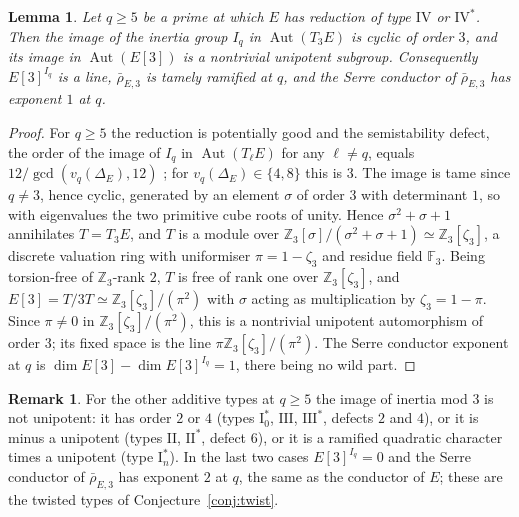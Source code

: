 \documentclass[11pt]{amsart}
\newtheorem{lemma}[theorem]{Lemma}
\theoremstyle{definition}
\newtheorem{remark}[theorem]{Remark}
\newcommand{\Z}{\mathbb{Z}}
\newcommand{\F}{\mathbb{F}}
\begin{document}
\begin{lemma}\label{lem:IV}
Let $q\ge5$ be a prime at which $E$ has reduction of type $\mathrm{IV}$ or $\mathrm{IV}^*$. Then the image of the inertia group $I_q$ in $\operatorname{Aut}(T_3E)$ is cyclic of order $3$, and its image in $\operatorname{Aut}(E[3])$ is a nontrivial unipotent subgroup. Consequently $E[3]^{I_q}$ is a line, $\bar\rho_{E,3}$ is tamely ramified at $q$, and the Serre conductor of $\bar\rho_{E,3}$ has exponent $1$ at $q$.
\end{lemma}

\begin{proof}
For $q\ge5$ the reduction is potentially good and the semistability defect, the order of the image of $I_q$ in $\operatorname{Aut}(T_\ell E)$ for any $\ell\ne q$, equals $12/\gcd(v_q(\Delta_E),12)$ \cite{Kraus90}; for $v_q(\Delta_E)\in\{4,8\}$ this is $3$. The image is tame since $q\ne3$, hence cyclic, generated by an element $\sigma$ of order $3$ with determinant $1$, so with eigenvalues the two primitive cube roots of unity. Hence $\sigma^2+\sigma+1$ annihilates $T=T_3E$, and $T$ is a module over $\Z_3[\sigma]/(\sigma^2+\sigma+1)\simeq\Z_3[\zeta_3]$, a discrete valuation ring with uniformiser $\pi=1-\zeta_3$ and residue field $\F_3$. Being torsion-free of $\Z_3$-rank $2$, $T$ is free of rank one over $\Z_3[\zeta_3]$, and $E[3]=T/3T\simeq\Z_3[\zeta_3]/(\pi^2)$ with $\sigma$ acting as multiplication by $\zeta_3=1-\pi$. Since $\pi\ne0$ in $\Z_3[\zeta_3]/(\pi^2)$, this is a nontrivial unipotent automorphism of order $3$; its fixed space is the line $\pi\Z_3[\zeta_3]/(\pi^2)$. The Serre conductor exponent at $q$ is $\dim E[3]-\dim E[3]^{I_q}=1$, there being no wild part.
\end{proof}

\begin{remark}\label{rem:types}
For the other additive types at $q\ge5$ the image of inertia mod $3$ is not unipotent: it has order $2$ or $4$ (types $\mathrm{I}_0^*$, $\mathrm{III}$, $\mathrm{III}^*$, defects $2$ and $4$), or it is minus a unipotent (types $\mathrm{II}$, $\mathrm{II}^*$, defect $6$), or it is a ramified quadratic character times a unipotent (type $\mathrm{I}_n^*$). In the last two cases $E[3]^{I_q}=0$ and the Serre conductor of $\bar\rho_{E,3}$ has exponent $2$ at $q$, the same as the conductor of $E$; these are the twisted types of Conjecture~\ref{conj:twist}.
\end{remark}
\end{document}
